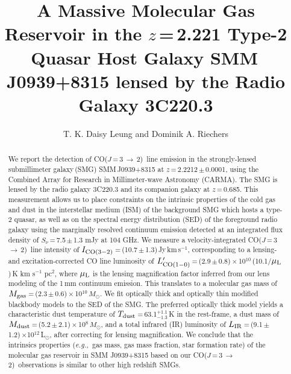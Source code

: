 \documentclass[twocolumn,apj,numberedappendix]{emulateapj}
\newcommand{\Msun}{\mbox{$M_{\odot}$}}
\newcommand{\Lsun}{\mbox{L$_{\odot}$}}
\newcommand{\CO}{\mbox{CO($J$\,=\,3\,$\rightarrow$\,2) }}
\newcommand{\Lp}{\mbox{$L^{\prime}_{\rm CO(1-0)}$}}
\newcommand{\LpU}{\mbox{K\,\,km\,\,s$^{-1}$\,\,pc$^2$}}
\newcommand{\eg}{{\sl e.g.,~}}
\newcommand{\pmOne}{\mbox{$^{-1}$}}
\begin{document}
\title{A Massive Molecular Gas Reservoir in the $z$\,=\,2.221 Type-2 Quasar Host Galaxy SMM\,J0939+8315 lensed by the Radio Galaxy 3C220.3}
\author{T. K. Daisy Leung and Dominik A. Riechers}

\begin{abstract}
We report the detection of \CO line emission in the strongly-lensed submillimeter galaxy\,(SMG) SMM\,J0939+8315 at $z$\,=\,2.2212\,$\pm$\,0.0001, using  
the Combined Array for Research in Millimeter-wave Astronomy (CARMA). 
The SMG is lensed by the radio galaxy 3C220.3 and its companion galaxy at $z$\,=\,0.685. 
This measurement allows us to place constraints on the intrinsic properties
of the cold gas and dust in the interstellar medium (ISM) of the background SMG which hosts a type-2 quasar, as well as on the spectral energy distribution (SED) of the foreground radio galaxy using the marginally resolved continuum 
emission detected at an integrated flux density of $S_\nu$\,=\,7.5\,$\pm$\,1.3 mJy
 at 104 GHz.
We measure a velocity-integrated \CO line intensity of $I_{\rm CO(3-2)}$\,=\,(10.7\,$\pm$\,1.3)\,Jy\,km\,s\pmOne,
corresponding to a lensing- and excitation-corrected CO line luminosity of \Lp\,=\,(2.9\,$\pm$\,0.8)\,$\times$\,10$^{10}$\,(10.1/$\mu_{\rm L}$)\,\LpU, where $\mu_{\rm L}$ is the lensing magnification factor inferred from our lens modeling of the 1\,mm continuum emission. 
 This
translates to a molecular gas mass of $M_{\rm gas}$\,=\,(2.3\,$\pm$\,0.6)\,$\times$\,10$^{10}$\,\Msun. We 
fit optically thick and optically thin modified blackbody models to the SED of the SMG. The preferred optically thick model yields a characteristic dust temperature of $T_{\rm dust}$\,=\,63.1$^{+1.1}_{-1.3}$\,K in the rest-frame, a dust mass of $M_{\rm dust}$\,=\,(5.2\,$\pm$\,2.1)\,$\times$\,10$^8$\,\Msun, and a total infrared (IR) luminosity of $L_{\rm IR}$\,=\,(9.1\,$\pm$\,1.2)\,$\times$10$^{12}$\,\Lsun, after correcting for lensing magnification. We conclude that the intrinsics properties (\eg gas mass, gas mass 
fraction, star formation rate) of the molecular gas reservoir in SMM
J0939+8315 based on our \CO observations is similar to other high redshift
SMGs. 
\end{abstract}
\end{document}
